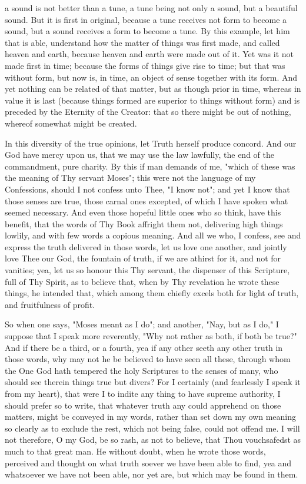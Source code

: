 \documentclass[b5paper,openright,12pt,twoside]{book}
\begin{document}
a sound is not better than a tune, a tune being not only a sound, but
a beautiful sound. But it is first in original, because a tune receives
not form to become a sound, but a sound receives a form to become a
tune. By this example, let him that is able, understand how the matter
of things was first made, and called heaven and earth, because heaven
and earth were made out of it. Yet was it not made first in time;
because the forms of things give rise to time; but that was without
form, but now is, in time, an object of sense together with its form.
And yet nothing can be related of that matter, but as though prior in
time, whereas in value it is last (because things formed are superior
to things without form) and is preceded by the Eternity of the Creator:
that so there might be out of nothing, whereof somewhat might be
created.

In this diversity of the true opinions, let Truth herself produce
concord. And our God have mercy upon us, that we may use the law
lawfully, the end of the commandment, pure charity. By this if man
demands of me, "which of these was the meaning of Thy servant Moses";
this were not the language of my Confessions, should I not confess unto
Thee, "I know not"; and yet I know that those senses are true, those
carnal ones excepted, of which I have spoken what seemed necessary. And
even those hopeful little ones who so think, have this benefit, that the
words of Thy Book affright them not, delivering high things lowlily,
and with few words a copious meaning. And all we who, I confess, see and
express the truth delivered in those words, let us love one another, and
jointly love Thee our God, the fountain of truth, if we are athirst for
it, and not for vanities; yea, let us so honour this Thy servant, the
dispenser of this Scripture, full of Thy Spirit, as to believe that,
when by Thy revelation he wrote these things, he intended that, which
among them chiefly excels both for light of truth, and fruitfulness of
profit.

So when one says, "Moses meant as I do"; and another, "Nay, but as I
do," I suppose that I speak more reverently, "Why not rather as both,
if both be true?" And if there be a third, or a fourth, yea if any other
seeth any other truth in those words, why may not he be believed to
have seen all these, through whom the One God hath tempered the holy
Scriptures to the senses of many, who should see therein things true but
divers? For I certainly (and fearlessly I speak it from my heart), that
were I to indite any thing to have supreme authority, I should prefer
so to write, that whatever truth any could apprehend on those matters,
might be conveyed in my words, rather than set down my own meaning so
clearly as to exclude the rest, which not being false, could not offend
me. I will not therefore, O my God, be so rash, as not to believe, that
Thou vouchsafedst as much to that great man. He without doubt, when he
wrote those words, perceived and thought on what truth soever we have
been able to find, yea and whatsoever we have not been able, nor yet
are, but which may be found in them.
\end{document}
